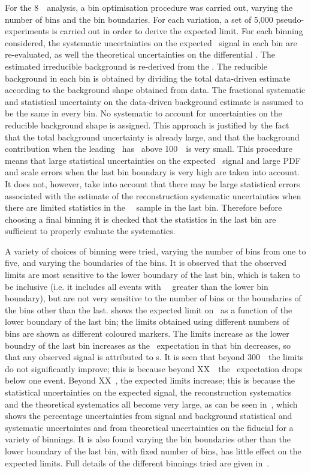 For the 8~\tev\ analysis, a bin optimisation procedure was carried out, varying
the number of bins and the bin boundaries. For each variation, a set of 5,000
pseudo-experiments is carried out in order to derive the expected limit. For
each binning considered, the systematic uncertainties on the expected \sm\ signal
in each bin are re-evaluated, as well the theoretical uncertainties on the
differential \cx. The estimated irreducible background is re-derived from the
\mc. The reducible background in each bin is obtained by dividing the total
data-driven estimate according to the background shape obtained from data. The
fractional systematic and statistical uncertainty on the data-driven background
estimate is assumed to be the same in every bin. No systematic to
account for uncertainties on the reducible background shape is assigned. This
approach is justified by the fact that the total background uncertainty is
already large, and that the background contribution when the leading \Z\ has
\pt\ above 100~\gev\ is very small.
This procedure means that large statistical uncertainties on the expected \sm\
signal and large PDF and scale errors when the last bin boundary is very high are taken into account. It does
not, however, take into account that there may be large statistical errors
associated with the estimate of the reconstruction systematic uncertainties when
there are limited statistics in the \sm\ \mc\ sample in the last bin. Therefore
before choosing a final binning it is checked that the statistics in the last
bin are sufficient to properly evaluate the systematics.

A variety of choices of binning were tried, varying the number of bins from one to
five, and varying the boundaries of the bins. It is observed that the observed
limits are most sensitive to the lower boundary of the last bin, which is taken to be
inclusive (i.e. it includes all events with \Z\ \pt\ greater than the lower bin
boundary), but are not very sensitive to the number of bins or the boundaries of
the bins other than the last. \fig{TGC-binOpt} shows the expected limit on
\ffourg\ as a
function of the lower boundary of the last bin; the limits obtained using
different numbers of bins are shown as different coloured markers. The limits
increase as the lower boundry of the last bin increases as the \sm\ expectation
in that bin decreases, so that any observed signal is attributed to \TGC s. It is seen
that beyond 300~\gev\ the limits do not significantly improve; this is because
beyond XX~\gev\ the \sm\ expectation drops below one event. Beyond XX~\gev, the
expected limits increase; this is because the statistical uncertainties on the
expected signal, the reconstruction systematics and the theoretical systematics
all become very large, as can be seen in~\fig{TGC-uncertainties}, which shows
the percentage uncertainties from signal and background statistical and
systematic uncertaintes and from theoretical uncertainties on the fiducial \cx
for a variety of binnings. It is also found varying the bin boundaries other
than the lower boundary of the last bin, with fixed number of bins, has little
effect on the expected limits. Full details of the different binnings tried
are given in~\app{}.

